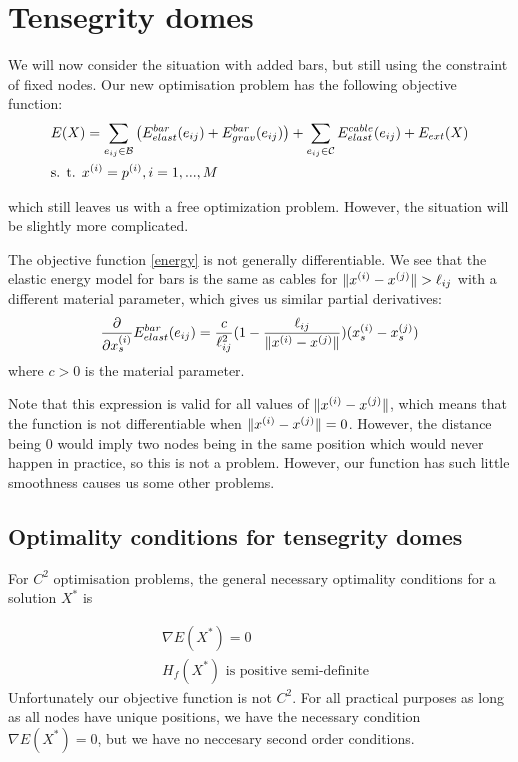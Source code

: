 \section{Tensegrity domes}
We will now consider the situation with added bars, but still using the constraint of fixed nodes. Our new optimisation problem has the following objective function:
\begin{equation}
\begin{aligned}
    \label{energy}
    &E(X) = \sum\limits_{e_{ij} \in \mathcal{B}}\big(E^{bar}_{elast}(e_{ij}) + E^{bar}_{grav}(e_{ij})\big) + \sum\limits_{e_{ij} \in \mathcal{C}} E^{cable}_{elast}(e_{ij}) + E_{ext}(X) \\
    & \text{s. t. } x^{(i)} = p^{(i)}, i=1,...,M
\end{aligned}
\end{equation}

which still leaves us with a free optimization problem. However, the situation will be slightly more complicated.

The objective function \eqref{energy} is not generally differentiable. We see that the elastic energy model for bars is the same as cables for $\lVert x^{(i)} - x^{(j)}\rVert > \ell_{ij}$ with a different material parameter, which gives us similar partial derivatives:
\begin{equation*}
\frac{\partial}{\partial x_s^{(i)}} E^{bar}_{elast}(e_{ij}) = \frac{c}{\ell_{ij}^2} (1- \frac{\ell_{ij}}{\lVert x^{(i)} - x^{(j)}\rVert}) (x_s^{(i)} - x_s^{(j)})
\end{equation*}
where $c > 0$ is the material parameter.

Note that this expression is valid for all values of $\lVert x^{(i)} - x^{(j)}\rVert$, which means that the function is not differentiable when $\lVert x^{(i)} - x^{(j)}\rVert = 0$. However, the distance being $0$ would imply two nodes being in the same position which would never happen in practice, so this is not a problem. However, our function has such little smoothness causes us some other problems.

\subsection{Optimality conditions for tensegrity domes}
For $C^2$ optimisation problems, the general necessary optimality conditions for a solution $X^*$ is

\begin{align*}
    &\nabla E(X^*) = 0\\
    & H_f(X^*) \text{ is positive semi-definite}
\end{align*}
Unfortunately our objective function is not $C^2$. For all practical purposes as long as all nodes have unique positions, we have the necessary condition $\nabla E(X^*) = 0$,  but we have no neccesary second order conditions.

